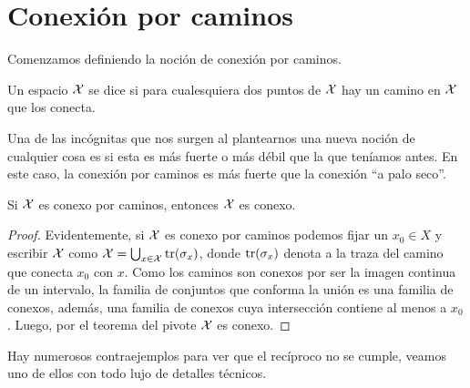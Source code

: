 \section{Conexión por caminos}
Comenzamos definiendo la noción de conexión por caminos.
\begin{defi}
	Un espacio $\mathcal{X}$ se dice  si para cualesquiera dos puntos de $\mathcal{X}$ hay un camino en $\mathcal{X}$ que los conecta.
\end{defi}
Una de las incógnitas que nos surgen al plantearnos una nueva noción de cualquier cosa es si esta es más fuerte o más débil que la que teníamos antes. En este caso, la conexión por caminos es más fuerte que la conexión ``a palo seco''.
\begin{prop}
	Si $\mathcal{X}$ es conexo por caminos, entonces $\mathcal{X}$ es conexo.
\end{prop}
\begin{proof}
	Evidentemente, si $\mathcal{X}$ es conexo por caminos podemos fijar un $x_0\in X$ y escribir $\mathcal{X}$ como $\mathcal{X}=\bigcup_{x\in\mathcal{X}}\operatorname{\mathrm{tr}}(\sigma_x)$, donde $\operatorname{\mathrm{tr}}(\sigma_x)$ denota a la traza del camino que conecta $x_0$ con $x$. Como los caminos son conexos por ser la imagen continua de un intervalo, la familia de conjuntos que conforma la unión es una familia de conexos, además, una familia de conexos cuya intersección contiene al menos a $x_0$. Luego, por el teorema del pivote $\mathcal{X}$ es conexo.
\end{proof}
Hay numerosos contraejemplos para ver que el recíproco no se cumple, veamos uno de ellos con todo lujo de detalles técnicos.
